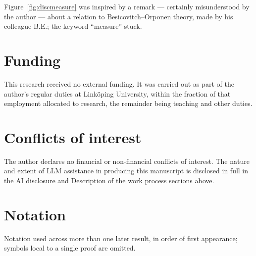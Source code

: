 \documentclass[a4paper,11pt,oneside,reqno]{amsart}
\theoremstyle{definition}
\theoremstyle{remark}
\theoremstyle{plain}
\begin{document}
Figure~\ref{fig:discmeasure} was inspired by a remark --- certainly misunderstood by the author ---
about a relation to Besicovitch--Orponen theory, made by his colleague B.E.; the keyword
``measure'' stuck.

\section*{Funding}

This research received no external funding. It was carried out as part of the author's regular
duties at Link\"oping University, within the fraction of that employment allocated to research, the
remainder being teaching and other duties.

\section*{Conflicts of interest}

The author declares no financial or non-financial conflicts of interest. The nature and extent of
LLM assistance in producing this manuscript is disclosed in full in the AI disclosure and
Description of the work process sections above.

\section*{Notation}

Notation used across more than one later result, in order of first appearance; symbols local to a
single proof are omitted.
\end{document}
